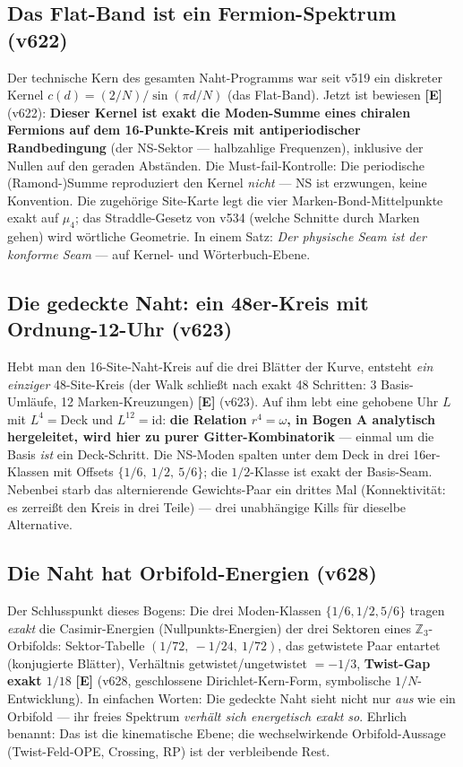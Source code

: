 \documentclass[11pt,a4paper]{article}
\newcommand{\E}{\textcolor{gut}{\textbf{[E]}}}
\begin{document}
\subsection*{Das Flat-Band ist ein Fermion-Spektrum (v622)}

Der technische Kern des gesamten Naht-Programms war seit v519 ein
diskreter Kernel $c(d) = (2/N)/\sin(\pi d/N)$ (\glqq{}das
Flat-Band\grqq{}). Jetzt ist bewiesen \E{} (v622): \textbf{Dieser
Kernel ist exakt die Moden-Summe eines chiralen Fermions auf dem
16-Punkte-Kreis mit antiperiodischer Randbedingung} (der
\glqq{}NS-Sektor\grqq{} --- halbzahlige Frequenzen), inklusive der
Nullen auf den geraden Abständen. Die Must-fail-Kontrolle: Die
periodische (Ramond-)Summe reproduziert den Kernel \emph{nicht} ---
NS ist erzwungen, keine Konvention. Die zugehörige Site-Karte legt
die vier Marken-Bond-Mittelpunkte exakt auf $\mu_4$; das
Straddle-Gesetz von v534 (\glqq{}welche Schnitte durch Marken
gehen\grqq{}) wird wörtliche Geometrie. In einem Satz: \emph{Der
physische Seam ist der konforme Seam} --- auf Kernel- und
Wörterbuch-Ebene.

\subsection*{Die gedeckte Naht: ein 48er-Kreis mit Ordnung-12-Uhr (v623)}

Hebt man den 16-Site-Naht-Kreis auf die drei Blätter der Kurve,
entsteht \emph{ein einziger} 48-Site-Kreis (der Walk schließt nach
exakt 48 Schritten: 3 Basis-Umläufe, 12 Marken-Kreuzungen) \E{}
(v623). Auf ihm lebt eine gehobene Uhr $L$ mit $L^4 = \mathrm{Deck}$
und $L^{12} = \mathrm{id}$: \textbf{die Relation $r^4 = \omega$, in
Bogen A analytisch hergeleitet, wird hier zu purer
Gitter-Kombinatorik} --- einmal um die Basis \emph{ist} ein
Deck-Schritt. Die NS-Moden spalten unter dem Deck in drei
16er-Klassen mit Offsets $\{1/6,\ 1/2,\ 5/6\}$; die $1/2$-Klasse ist
exakt der Basis-Seam. Nebenbei starb das alternierende
Gewichts-Paar ein drittes Mal (Konnektivität: es zerreißt den Kreis
in drei Teile) --- drei unabhängige Kills für dieselbe Alternative.

\subsection*{Die Naht hat Orbifold-Energien (v628)}

Der Schlusspunkt dieses Bogens: Die drei Moden-Klassen
$\{1/6, 1/2, 5/6\}$ tragen \emph{exakt} die Casimir-Energien
(Nullpunkts-Energien) der drei Sektoren eines
$\mathbb{Z}_3$-Orbifolds: Sektor-Tabelle $(1/72,\ -1/24,\ 1/72)$,
das getwistete Paar entartet (konjugierte Blätter), Verhältnis
getwistet/ungetwistet $= -1/3$, \textbf{Twist-Gap exakt $1/18$} \E{}
(v628, geschlossene Dirichlet-Kern-Form, symbolische
$1/N$-Entwicklung). In einfachen Worten: Die gedeckte Naht sieht
nicht nur \emph{aus} wie ein Orbifold --- ihr freies Spektrum
\emph{verhält sich energetisch exakt so}. Ehrlich benannt: Das ist
die kinematische Ebene; die wechselwirkende Orbifold-Aussage
(Twist-Feld-OPE, Crossing, RP) ist der verbleibende Rest.
\end{document}
